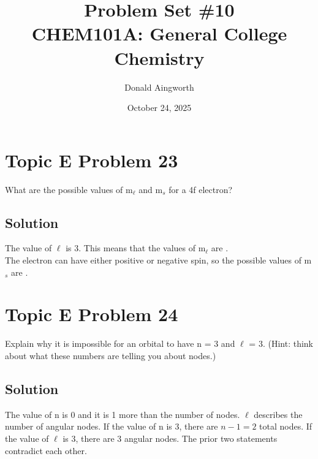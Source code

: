 \documentclass[10pt]{article}
\title{
    Problem Set \#10
    \\  \small
    CHEM101A: General College Chemistry
    }
\author{Donald Aingworth}
\date{October 24, 2025}
\begin{document}

    \maketitle

    \setcounter{section}{9}

    \pagebreak
    \section{Topic E Problem 23}
        What are the possible values of m$_\ell$ and m$_s$ for a 4f electron?
        
        \subsection{Solution}
            The value of $\ell$ is 3.
            This means that the values of m$_\ell$ are .\\
            The electron can have either positive or negative spin, so the possible values of m$_s$ are .

    \section{Topic E Problem 24}
        Explain why it is impossible for an orbital to have n = 3 and $\ell$ = 3. 
        (Hint: think about what these numbers are telling you about nodes.)

        \subsection{Solution}
            The value of n is 0 and it is 1 more than the number of nodes.
            $\ell$ describes the number of angular nodes.
            If the value of n is 3, there are $n - 1 = 2$ total nodes.
            If the value of $\ell$ is 3, there are 3 angular nodes.
            The prior two statements contradict each other.

    \pagebreak
\end{document}
